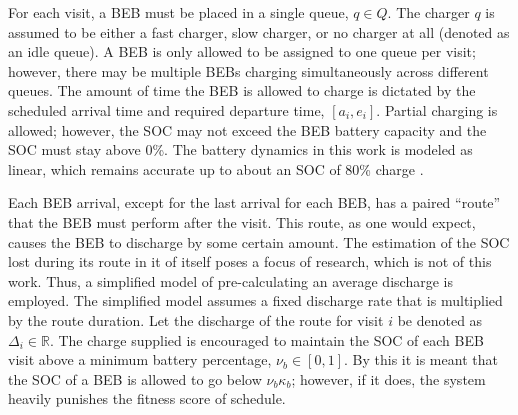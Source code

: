 \documentclass[11pt,a4paper,final]{article}
\newcommand{\Qset}{Q}                       %
\begin{document}
For each visit, a BEB must be placed in a single queue, \(q \in \Qset\). The charger \(q\) is assumed to be either a fast
charger, slow charger, or no charger at all (denoted as an idle queue). A BEB is only allowed to be assigned to one
queue per visit; however, there may be multiple BEBs charging simultaneously across different queues. The amount of time
the BEB is allowed to charge is dictated by the scheduled arrival time and required departure time, \([a_i, e_i]\).
Partial charging is allowed; however, the SOC may not exceed the BEB battery capacity and the SOC must stay above 0\%.
The battery dynamics in this work is modeled as linear, which remains accurate up to about an SOC of 80\% charge
\cite{li-2016-batter-elect}.

Each BEB arrival, except for the last arrival for each BEB, has a paired ``route'' that the BEB must perform after the
visit. This route, as one would expect, causes the BEB to discharge by some certain amount. The estimation of the SOC
lost during its route in it of itself poses a focus of research, which is not of this work. Thus, a simplified model of
pre-calculating an average discharge is employed. The simplified model assumes a fixed discharge rate that is multiplied
by the route duration. Let the discharge of the route for visit \(i\) be denoted as \(\Delta_i \in \mathbb{R}\). The charge supplied is
encouraged to maintain the SOC of each BEB visit above a minimum battery percentage, \(\nu_b \in [0, 1]\). By this it is meant
that the SOC of a BEB is allowed to go below \(\nu_b\kappa_b\); however, if it does, the system heavily punishes the fitness
score of schedule.
\end{document}
